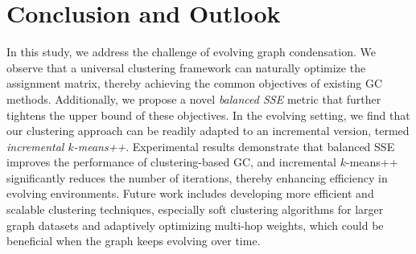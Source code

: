\section{Conclusion and Outlook}
In this study, we address the challenge of evolving graph condensation. We observe that a universal clustering framework can naturally optimize the assignment matrix, thereby achieving the common objectives of existing GC methods. Additionally, we propose a novel \emph{balanced SSE} metric that further tightens the upper bound of these objectives. In the evolving setting, we find that our clustering approach can be readily adapted to an incremental version, termed \emph{incremental \(k\)-means++}. Experimental results demonstrate that balanced SSE improves the performance of clustering-based GC, and incremental \(k\)-means++ significantly reduces the number of iterations, thereby enhancing efficiency in evolving environments. Future work includes developing more efficient and scalable clustering techniques, especially soft clustering algorithms for larger graph datasets and adaptively optimizing multi-hop weights, which could be beneficial when the graph keeps evolving over time.





